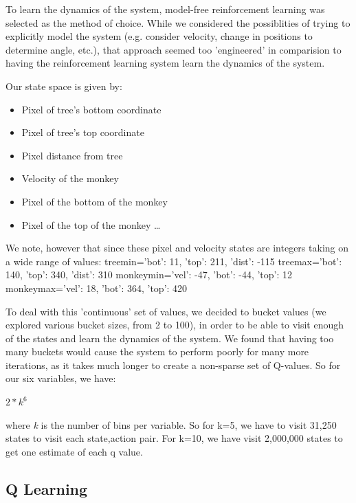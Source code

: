 \documentclass[11pt, oneside]{article}   	%
\begin{document}
To learn the dynamics of the system, model-free reinforcement learning was selected as the method of choice. While we considered the possiblities of trying to explicitly model the system (e.g. consider velocity, change in positions to determine angle, etc.), that approach seemed too 'engineered' in comparision to having the reinforcement learning system learn the dynamics of the system.

Our state space is given by:

\begin{itemize}

  \item Pixel of tree's bottom coordinate
  \item Pixel of tree's top coordinate
  \item Pixel distance from tree
  \item Velocity of the monkey
  \item Pixel of the bottom of the monkey
  \item Pixel of the top of the monkey \ldots

\end{itemize}

We note, however that since these pixel and velocity states are integers taking on a wide range of values:
\newline
treemin={'bot': 11, 'top': 211, 'dist': -115}
\newline
treemax={'bot': 140, 'top': 340, 'dist': 310}
\newline
monkeymin={'vel': -47, 'bot': -44, 'top': 12}
\newline
monkeymax={'vel': 18, 'bot': 364, 'top': 420}
\newline 

To deal with this 'continuous' set of values, we decided to bucket values (we explored various bucket sizes, from 2 to 100), in order to be able to visit enough of the states and learn the dynamics of the system. We found that having too many buckets would cause the system to perform poorly for many more iterations, as it takes much longer to create a non-sparse set of Q-values. So for our six variables, we have:
\begin{center}
{$2*k^{6}$} 
\end{center}
where \textit{k} is the number of bins per variable. So for k=5, we have to visit 31,250 states to visit each state,action pair. For k=10, we have visit 2,000,000 states to get one estimate of each q value.

\subsection*{Q Learning}
\end{document}
